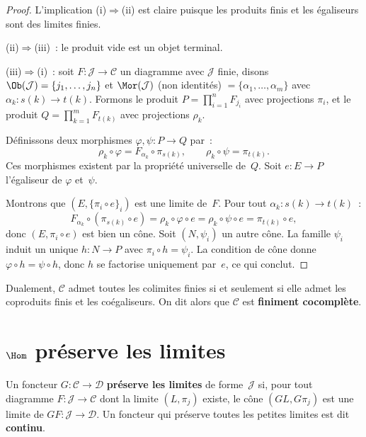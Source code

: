 \begin{proof}
L'implication (i)$\Rightarrow$(ii) est claire puisque les produits finis
et les égaliseurs sont des limites finies.

(ii)$\Rightarrow$(iii)~: le produit vide est un objet terminal.

(iii)$\Rightarrow$(i)~: soit $F\colon\mathcal{J}\to\mathcal{C}$ un diagramme
avec $\mathcal{J}$ finie, disons $\Ob(\mathcal{J})=\{j_1,\dots,j_n\}$
et $\Mor(\mathcal{J})$ (non identités) $= \{\alpha_1,\dots,\alpha_m\}$
avec $\alpha_k\colon s(k)\to t(k)$.
Formons le produit $P = \prod_{i=1}^n F_{j_i}$ avec projections $\pi_i$,
et le produit $Q = \prod_{k=1}^m F_{t(k)}$ avec projections $\rho_k$.

Définissons deux morphismes $\varphi,\psi\colon P\to Q$ par~:
\[
    \rho_k\circ\varphi = F_{\alpha_k}\circ\pi_{s(k)},
    \qquad
    \rho_k\circ\psi = \pi_{t(k)}.
\]
Ces morphismes existent par la propriété universelle de~$Q$.
Soit $e\colon E\to P$ l'égaliseur de $\varphi$ et~$\psi$.

Montrons que $(E, \{\pi_i\circ e\}_i)$ est une limite de~$F$.
Pour tout $\alpha_k\colon s(k)\to t(k)$~:
\[
    F_{\alpha_k}\circ(\pi_{s(k)}\circ e)
    = \rho_k\circ\varphi\circ e
    = \rho_k\circ\psi\circ e
    = \pi_{t(k)}\circ e,
\]
donc $(E, \pi_i\circ e)$ est bien un cône.
Soit $(N,\psi_i)$ un autre cône. La famille $\psi_i$ induit un unique
$h\colon N\to P$ avec $\pi_i\circ h = \psi_i$.
La condition de cône donne $\varphi\circ h = \psi\circ h$, donc
$h$ se factorise uniquement par~$e$, ce qui conclut.
\end{proof}

\begin{corollaire}\label{cor:existence-colimites-finies}
Dualement, $\mathcal{C}$ admet toutes les colimites finies
si et seulement si elle admet les coproduits finis et les coégaliseurs.
On dit alors que $\mathcal{C}$ est \textbf{finiment cocomplète}.
\end{corollaire}


\section{$\Hom$ préserve les limites}\label{sec:hom-preserve-limites}

\begin{definition}\label{def:preservation-limites}
Un foncteur $G\colon\mathcal{C}\to\mathcal{D}$ \textbf{préserve les limites}
de forme~$\mathcal{J}$ si, pour tout diagramme $F\colon\mathcal{J}\to\mathcal{C}$
dont la limite $(L,\pi_j)$ existe, le cône $(GL, G\pi_j)$ est une limite de
$GF\colon\mathcal{J}\to\mathcal{D}$.
Un foncteur qui préserve toutes les petites limites est dit \textbf{continu}.
\end{definition}

